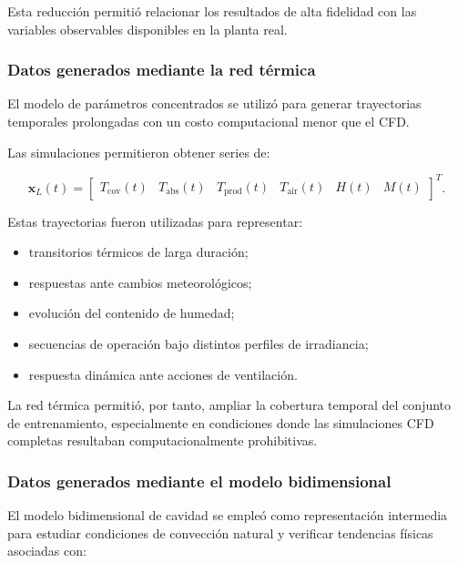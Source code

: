 Esta reducción permitió relacionar los resultados de alta fidelidad con las variables observables disponibles en la planta real.

\subsubsection{Datos generados mediante la red térmica}

El modelo de parámetros concentrados se utilizó para generar trayectorias temporales prolongadas con un costo computacional menor que el CFD.

Las simulaciones permitieron obtener series de:

\begin{equation}
\mathbf{x}_{L}(t)
=
\begin{bmatrix}
T_{\mathrm{cov}}(t) &
T_{\mathrm{abs}}(t) &
T_{\mathrm{prod}}(t) &
T_{\mathrm{air}}(t) &
H(t) &
M(t)
\end{bmatrix}^{T}.
\label{eq:estados_lumped_simulados}
\end{equation}

Estas trayectorias fueron utilizadas para representar:

\begin{itemize}
    \item transitorios térmicos de larga duración;
    \item respuestas ante cambios meteorológicos;
    \item evolución del contenido de humedad;
    \item secuencias de operación bajo distintos perfiles de irradiancia;
    \item respuesta dinámica ante acciones de ventilación.
\end{itemize}

La red térmica permitió, por tanto, ampliar la cobertura temporal del conjunto de entrenamiento, especialmente en condiciones donde las simulaciones CFD completas resultaban computacionalmente prohibitivas.

\subsubsection{Datos generados mediante el modelo bidimensional}

El modelo bidimensional de cavidad se empleó como representación intermedia para estudiar condiciones de convección natural y verificar tendencias físicas asociadas con:


